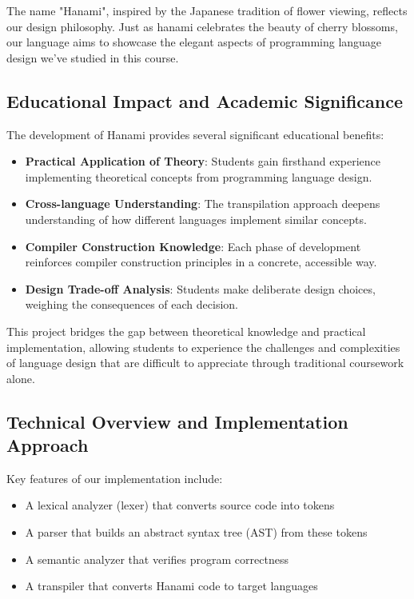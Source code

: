 \documentclass[conference]{IEEEtran}
\begin{document}
	The name "Hanami", inspired by the Japanese tradition of flower viewing, reflects our design philosophy. Just as hanami celebrates the beauty of cherry blossoms, our language aims to showcase the elegant aspects of programming language design we've studied in this course.
	
	\subsection{Educational Impact and Academic Significance}
	
	The development of Hanami provides several significant educational benefits:
	
	\begin{itemize}
		\item \textbf{Practical Application of Theory}: Students gain firsthand experience implementing theoretical concepts from programming language design.
		
		\item \textbf{Cross-language Understanding}: The transpilation approach deepens understanding of how different languages implement similar concepts.
		
		\item \textbf{Compiler Construction Knowledge}: Each phase of development reinforces compiler construction principles in a concrete, accessible way.
		
		\item \textbf{Design Trade-off Analysis}: Students make deliberate design choices, weighing the consequences of each decision.
	\end{itemize}
	
	This project bridges the gap between theoretical knowledge and practical implementation, allowing students to experience the challenges and complexities of language design that are difficult to appreciate through traditional coursework alone.
	
	\subsection{Technical Overview and Implementation Approach}
	
	Key features of our implementation include:
	
	\begin{itemize}
		\item A lexical analyzer (lexer) that converts source code into tokens
		\item A parser that builds an abstract syntax tree (AST) from these tokens
		\item A semantic analyzer that verifies program correctness
		\item A transpiler that converts Hanami code to target languages
	\end{itemize}
	
\end{document}
